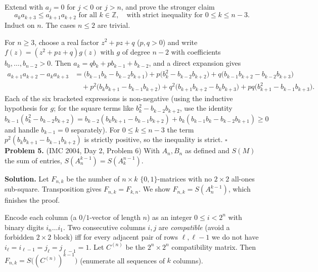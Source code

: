 \documentclass{article}
\newcommand{\Z}{\mathbb{Z}}
\begin{document}
Extend with \( a_j = 0 \) for \( j < 0 \) or \( j > n \), and prove the stronger claim
\[
a_k a_{k+3} \leq a_{k+1} a_{k+2} \text{ for all } k \in \Z, \quad \text{with strict inequality for } 0 \leq k \leq n-3.
\]
Induct on \( n \). The cases \( n \leq 2 \) are trivial.

For \( n \geq 3 \), choose a real factor \( z^2 + pz + q \) (\( p, q > 0 \)) and write \( f(z) = (z^2 + pz + q) g(z) \) with \( g \) of degree \( n-2 \) with coefficients \( b_0, \ldots, b_{n-2} > 0 \). Then \( a_k = q b_k + p b_{k-1} + b_{k-2} \), and a direct expansion gives
\begin{align*}
a_{k+1} a_{k+2} - a_k a_{k+3}
&= \bigl(b_{k-1} b_k - b_{k-2} b_{k+1}\bigr)
+ p \bigl(b_k^2 - b_{k-2} b_{k+2}\bigr)
+ q \bigl(b_{k-1} b_{k+2} - b_{k-2} b_{k+3}\bigr) \\
&\quad + p^2 \bigl(b_k b_{k+1} - b_{k-1} b_{k+2}\bigr)
+ q^2 \bigl(b_{k+1} b_{k+2} - b_k b_{k+3}\bigr)
+ pq \bigl(b_{k+1}^2 - b_{k-1} b_{k+3}\bigr).
\end{align*}
Each of the six bracketed expressions is non-negative (using the inductive hypothesis for \( g \); for the square terms like \( b_k^2 - b_{k-2} b_{k+2} \), use the identity
\( b_{k-1}(b_k^2 - b_{k-2} b_{k+2}) = b_{k-2}(b_k b_{k+1} - b_{k-1} b_{k+2}) + b_k(b_{k-1} b_k - b_{k-2} b_{k+1}) \geq 0 \)
and handle \( b_{k-1} = 0 \) separately). For \( 0 \leq k \leq n-3 \) the term \( p^2 (b_k b_{k+1} - b_{k-1} b_{k+2}) \) is strictly positive, so the inequality is strict. \hfill\(\square\)
\\

\textbf{Problem 5.} (IMC 2004, Day 2, Problem 6)
With \( A_n, B_n \) as defined and \( S(M) \) the sum of entries, \( S(A_n^{k-1}) = S(A_k^{n-1}) \).

\textbf{Solution.}
Let \( F_{n,k} \) be the number of \( n \times k \) \( \{0,1\} \)-matrices with no \( 2 \times 2 \) all-ones sub-square. Transposition gives \( F_{n,k} = F_{k,n} \). We show \( F_{n,k} = S(A_n^{k-1}) \), which finishes the proof.

Encode each column (a \( 0/1 \)-vector of length \( n \)) as an integer \( 0 \leq i < 2^n \) with binary digits \( i_n \ldots i_1 \). Two consecutive columns \( i, j \) are \emph{compatible} (avoid a forbidden \( 2 \times 2 \) block) iff for every adjacent pair of rows \( \ell, \ell - 1 \) we do not have \( i_\ell = i_{\ell-1} = j_\ell = j_{\ell-1} = 1 \). Let \( C^{(n)} \) be the \( 2^n \times 2^n \) compatibility matrix. Then \( F_{n,k} = S\bigl((C^{(n)})^{k-1}\bigr) \) (enumerate all sequences of \( k \) columns).
\end{document}
